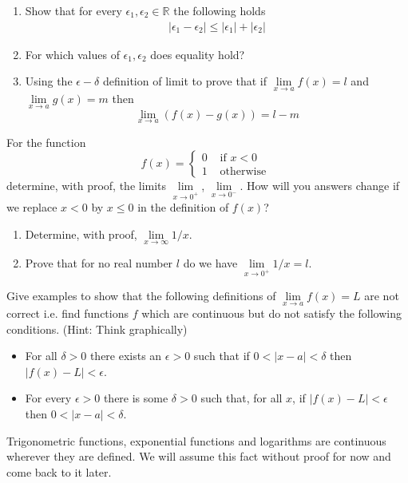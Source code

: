 \documentclass[9pt, a4paper, oneside]{amsart}
\begin{document}
\begin{questions}[resume]
	\item
	\begin{enumerate}
		\item Show that for every $ \epsilon_1, \epsilon_2 \in \mathbb{R}$ the following holds
		      \begin{align*}
		      	|\epsilon_1 - \epsilon _ 2| \le |\epsilon_1| + |\epsilon_2|
		      \end{align*}
		\item For which values of $ \epsilon_1, \epsilon_2 $ does equality hold?
		\item Using the $\epsilon-\delta$ definition of limit to prove that if $\lim \limits _ {x \rightarrow a} f(x) = l$ and $\lim \limits _ {x \rightarrow a} g(x) = m$ then $$\lim \limits _ {x \rightarrow a} \left(f(x)- g(x)\right) = l-m$$
	\end{enumerate}

	\item For the function 	$$ f(x) = \begin{cases} 0 & \mbox{ if } x < 0 \\ 1 & \mbox{ otherwise }\end{cases}$$
	determine, with proof, the limits $ \lim \limits_{x \rightarrow 0^+}$, $ \lim \limits_{x \rightarrow 0^-}$. How will you answers change if we replace $ x<0$ by $ x\le 0$ in the definition of $ f(x)$?


	\item
	\begin{enumerate}
		\item Determine, with proof, $\lim \limits_{x \rightarrow \infty} 1/x$.
		\item Prove that for no real number $l$ do we have $\lim \limits_{x \rightarrow 0^+} 1/x = l$.
	\end{enumerate}


	\item Give examples to show that the following definitions of $\lim \limits _ {x \rightarrow a} f(x) = L$ are not correct i.e. find functions $ f$ which are continuous but do not satisfy the following conditions. (Hint: Think graphically)
	\begin{itemize}
		\item For all $ \delta > 0$ there exists an $ \epsilon > 0$ such that if $ 0<|x-a|< \delta$ then $ |f(x) - L|< \epsilon$.
		\item For every $\epsilon > 0$ there is some $\delta > 0$ such that, for all $x$, if $|f(x) - L| < \epsilon$ then $0 < |x - a| < \delta$.
	\end{itemize}

\end{questions}
Trigonometric functions, exponential functions and logarithms are continuous wherever they are defined. We will assume this fact without proof for now and come back to it later.
\end{document}
